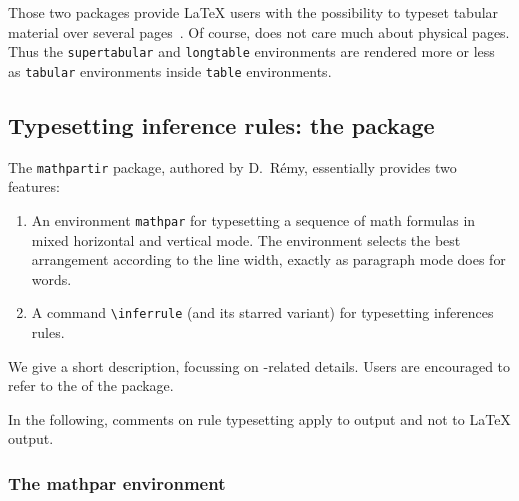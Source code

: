 Those two packages provide \LaTeX{} users with the
possibility to typeset tabular material over several
pages~\cite[Section~5.4]{latexbis}. Of course, \hevea{}
does not care much about physical pages.
Thus the \texttt{supertabular}
and \texttt{longtable} environments are rendered more or less
as \texttt{tabular} environments inside \texttt{table} environments.

\subsection{Typesetting inference rules: the
\label{mathpartir:package}  package}
%
The \texttt{mathpartir} package, authored by D.~R\'emy, essentially
provides two features:
\begin{enumerate}
\item
An environment \texttt{mathpar} for typesetting a sequence of math formulas in mixed horizontal and vertical mode. The environment selects the best arrangement according to the line width, exactly as paragraph mode does for words.
\item A command \verb+\inferrule+ (and its starred variant) for
typesetting inferences rules.
\end{enumerate}
We give a short description, focussing on \hevea{}-related details.
Users are encouraged to refer to the
 of the package.

In the following, comments on rule typesetting apply to \hevea{} output
and not to \LaTeX{} output.

\subsubsection {The mathpar environment}

